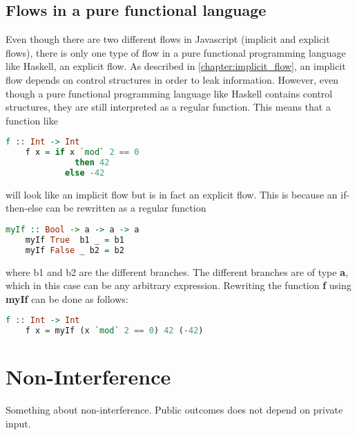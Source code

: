 \subsection{Flows in a pure functional language}
Even though there are two different flows in Javascript (implicit and explicit flows), there is only one type of flow in a pure functional programming language like Haskell, an explicit flow.\cite{seclib} As described in \ref{chapter:implicit_flow}, an implicit flow depends on control structures in order to leak information. However, even though a pure functional programming language like Haskell contains control structures, they are still interpreted as a regular function. This means that a function like
\begin{center}
  \begin{lstlisting}[language=Haskell]
    f :: Int -> Int
    f x = if x `mod` 2 == 0
              then 42
            else -42
  \end{lstlisting}
\end{center}
will look like an implicit flow but is in fact an explicit flow. This is because an if-then-else can be rewritten as a regular function \cite{if-then-else}
\begin{center}
  \begin{lstlisting}[language=Haskell]
    myIf :: Bool -> a -> a -> a
    myIf True  b1 _ = b1
    myIf False _ b2 = b2
  \end{lstlisting}
\end{center}
where b1 and b2 are the different branches. The different branches are of type \textbf{a}, which in this case can be any arbitrary expression. Rewriting the function \textbf{f} using \textbf{myIf} can be done as follows:
\begin{center}
  \begin{lstlisting}[language=Haskell]
    f :: Int -> Int
    f x = myIf (x `mod` 2 == 0) 42 (-42)
  \end{lstlisting}
\end{center}

\section{Non-Interference}
Something about non-interference. Public outcomes does not depend on private input.

